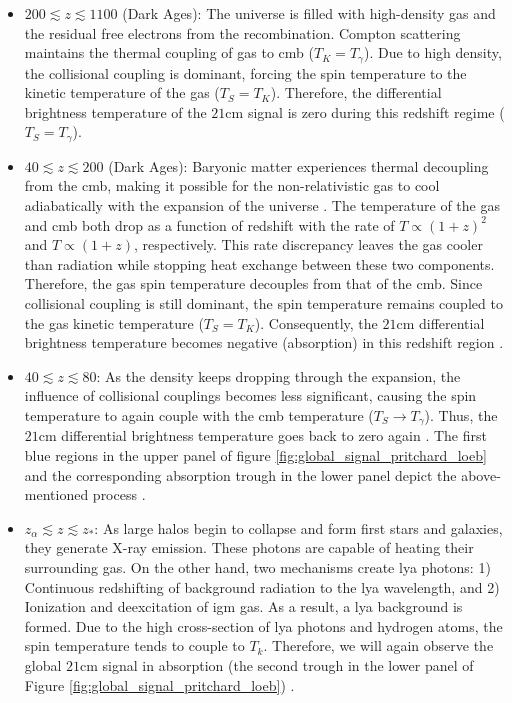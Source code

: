 \documentclass[12pt, TexShade, letterpaper]{report}
\begin{document}
\begin{itemize}
\item $200 \lesssim z \lesssim 1100$ (Dark Ages): The universe is filled with high-density gas and the residual free electrons from the recombination. Compton scattering maintains the thermal coupling of gas to \gls{cmb} ($T_K = T_\gamma$). Due to high density, the collisional coupling is dominant, forcing the spin temperature to the kinetic temperature of the gas ($T_S = T_K$). 
Therefore, the differential brightness temperature of the $\mathrm{21cm}$ signal is zero during this redshift regime ($T_S = T_\gamma$)\cite{21century}.\par

\item $40 \lesssim z \lesssim 200$ (Dark Ages): Baryonic matter experiences thermal decoupling from the \gls{cmb}, making it possible for the non-relativistic gas to cool adiabatically with the expansion of the universe \cite{21century}. The temperature of the gas and \gls{cmb} both drop as a function of redshift with the rate of $T\propto (1+z)^{2}$ and $T\propto (1+z)$, respectively. This rate discrepancy leaves the gas cooler than radiation while stopping heat exchange between these two components. Therefore, the gas spin temperature decouples from that of the \gls{cmb}. Since collisional coupling is still dominant, the spin temperature remains coupled to the gas kinetic temperature ($T_S = T_K$). Consequently, the $\mathrm{21cm}$ differential brightness temperature becomes negative (absorption) in this redshift region \cite{map_universe, 21century}.\par

\item $40 \lesssim z \lesssim 80$: As the density keeps dropping through the expansion, the influence of collisional couplings becomes less significant, causing the spin temperature to again couple with the \gls{cmb} temperature ($T_S \rightarrow T_\gamma$). Thus, the $\mathrm{21cm}$ differential brightness temperature goes back to zero again \cite{map_universe}. The first blue regions in the upper panel of figure \ref{fig:global_signal_pritchard_loeb} and the corresponding absorption trough in the lower panel depict the above-mentioned process \cite{map_universe, 21century}.\par

\item $z_\alpha \lesssim z \lesssim z_*$: As large halos begin to collapse and form first stars and galaxies, they generate X-ray emission. These photons are capable of heating their surrounding gas. On the other hand, two mechanisms create \gls{lya} photons: 1) Continuous redshifting of background radiation to the \gls{lya} wavelength, and 2) Ionization and deexcitation of \gls{igm} gas. As a result, a \gls{lya} background is formed. Due to the high cross-section of \gls{lya} photons and hydrogen atoms, the spin temperature tends to couple to $T_k$. Therefore, we will again observe the global $\mathrm{21cm}$ signal in absorption (the second trough in the lower panel of Figure \ref{fig:global_signal_pritchard_loeb}) \cite{map_universe, 21century}.\par


\end{itemize}
\end{document}
